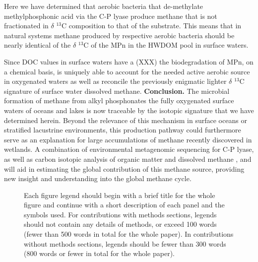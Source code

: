 \documentclass{nature}
\begin{document}
Here we have determined that aerobic bacteria that de-methylate methylphosphonic acid via the C-P lyase produce methane that is not fractionated in $\delta$ $^13$C composition to that of the substrate. This means that in natural systems methane produced by respective aerobic bacteria should be nearly identical of the $\delta$ $^13$C of the MPn in the HWDOM pool in surface waters.

Since DOC values in surface waters have a (XXX) the biodegradation of MPn, on a chemical basis, is uniquely able to account for the needed active aerobic source in oxygenated waters as well as reconcile the previously enigmatic lighter $\delta$ $^13$C signature of surface water dissolved methane.
\textbf{Conclusion.} The microbial formation of methane from alkyl phosphonates the fully oxygenated surface waters of oceans and lakes is now traceable by the isotopic signature that we have determined herein. Beyond the relevance of this mechanism in surface oceans or stratified lacustrine environments, this production pathway could furthermore serve as an explanation for large accumulations of methane recently discovered in wetlands. A combination of environmental metagenomic sequencing for C-P lyase, as well as carbon isotopic analysis of organic matter and dissolved methane , and will aid in estimating the global contribution of this methane source, providing new insight and understanding into the global methane cycle.  


\begin{figure}
\caption{Each figure legend should begin with a brief title for
the whole figure and continue with a short description of each
panel and the symbols used. For contributions with methods
sections, legends should not contain any details of methods, or
exceed 100 words (fewer than 500 words in total for the whole
paper). In contributions without methods sections, legends should
be fewer than 300 words (800 words or fewer in total for the whole
paper).}
\end{figure}

\begin{methods}


\end{methods}


\end{document}
